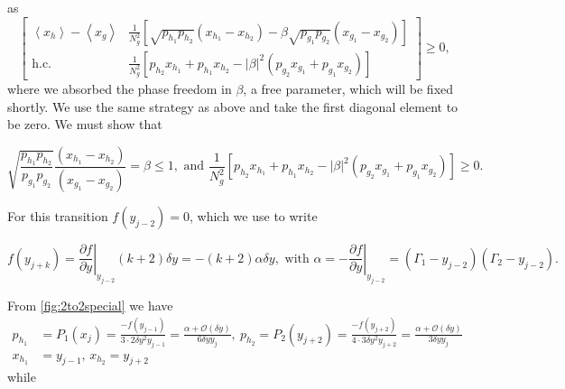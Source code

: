 \documentclass{theoretics}
\begin{document}
as
\begin{displaymath}
  \left[\begin{array}{cc}
      \left\langle x_{h}\right\rangle -\left\langle x_{g}\right\rangle & \frac{1}{N_{g}^{2}}\left[\sqrt{p_{h_{1}}p_{h_{2}}}(x_{h_{1}}-x_{h_{2}})-\beta\sqrt{p_{g_{1}}p_{g_{2}}}(x_{g_{1}}-x_{g_{2}})\right]  \\
      \text{h.c.}                                                      & \frac{1}{N_{g}^{2}}\left[p_{h_{2}}x_{h_{1}}+p_{h_{1}}x_{h_{2}}-\left|\beta\right|^{2}(p_{g_{2}}x_{g_{1}}+p_{g_{1}}x_{g_{2}})\right]
    \end{array}\right]\ge0,
\end{displaymath}
where we absorbed the phase freedom in $\beta$, a free parameter,
which will be fixed shortly. We use the same strategy as above and
take the first diagonal element to be zero.
We must show that
\begin{small}
  \begin{displaymath}
    \sqrt{\frac{p_{h_{1}}p_{h_{2}}}{p_{g_{1}}p_{g_{2}}}}\frac{(x_{h_{1}}-x_{h_{2}})}{(x_{g_{1}}-x_{g_{2}})}=\beta\le1,
    \text{ and }
    \frac{1}{N_{g}^{2}}\left[p_{h_{2}}x_{h_{1}}+p_{h_{1}}x_{h_{2}}-\left|\beta\right|^{2}(p_{g_{2}}x_{g_{1}}+p_{g_{1}}x_{g_{2}})\right]\ge0.
  \end{displaymath}
\end{small}For this transition $f(y_{j-2})=0$, which we use to write
\begin{small}
  \begin{displaymath}
    f(y_{j+k})=\left.\frac{\partial f}{\partial y}\right|_{y_{j-2}}(k+2)\delta y=-(k+2)\alpha\delta y, \text{ with }
    \alpha=-\left.\frac{\partial f}{\partial y}\right|_{y_{j-2}}=(\Gamma_{1}-y_{j-2})(\Gamma_{2}-y_{j-2}).
  \end{displaymath}
\end{small}
From  \cref{fig:2to2special} we have
\begin{align*}
  p_{h_{1}} & =P_{1}(x_{j})=\frac{-f(y_{j-1})}{3\cdot 2\delta y^{2}y_{j-1}}=\frac{\alpha+\mathcal{O}(\delta y)}{6\delta yy_{j}},\
  p_{h_{2}}  =P_{2}(y_{j+2})=\frac{-f(y_{j+2})}{4\cdot 3\delta y^{2}y_{j+2}}=\frac{\alpha+\mathcal{O}(\delta y)}{3\delta yy_{j}}  \\
  x_{h_{1}} & =y_{j-1},\,x_{h_{2}}=y_{j+2}
\end{align*}
while
\end{document}
